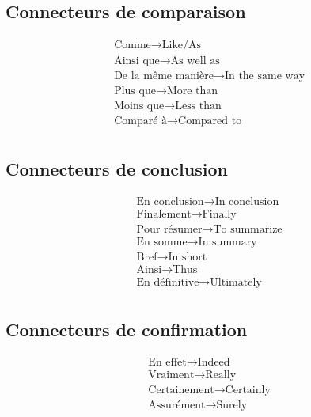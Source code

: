 \documentclass[12pt, a4paper]{article}
\begin{document}
\begin{multicols*}{3}
\subsection{Connecteurs de comparaison}
\vspace{-10pt}
\begin{align*}
  &\text{Comme} \rightarrow \text{Like/As}\\
  &\text{Ainsi que} \rightarrow \text{As well as}\\
  &\text{De la même manière} \rightarrow \text{In the same way}\\
  &\text{Plus que} \rightarrow \text{More than}\\
  &\text{Moins que} \rightarrow \text{Less than}\\
  &\text{Comparé à} \rightarrow \text{Compared to}\\
\end{align*}
\vspace{-40pt}

\subsection{Connecteurs de conclusion}
\vspace{-10pt}
\begin{align*}
  &\text{En conclusion} \rightarrow \text{In conclusion}\\
  &\text{Finalement} \rightarrow \text{Finally}\\
  &\text{Pour résumer} \rightarrow \text{To summarize}\\
  &\text{En somme} \rightarrow \text{In summary}\\
  &\text{Bref} \rightarrow \text{In short}\\
  &\text{Ainsi} \rightarrow \text{Thus}\\
  &\text{En définitive} \rightarrow \text{Ultimately}\\
\end{align*}
\vspace{-40pt}

\subsection{Connecteurs de confirmation}
\vspace{-10pt}
\begin{align*}
  &\text{En effet} \rightarrow \text{Indeed}\\
  &\text{Vraiment} \rightarrow \text{Really}\\
  &\text{Certainement} \rightarrow \text{Certainly}\\
  &\text{Assurément} \rightarrow \text{Surely}\\
\end{align*}


\end{multicols*}
\end{document}
